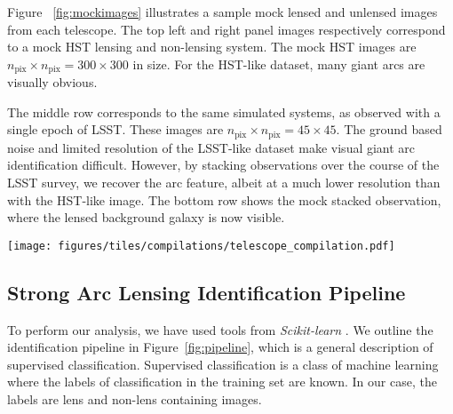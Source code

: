 \documentclass{emulateapj}
\begin{document}
Figure ~\ref{fig:mockimages} illustrates a sample mock lensed and
unlensed images from each telescope.  The top left and right panel
images respectively correspond to a mock HST lensing and non-lensing
system. The mock HST images are $n_\text{pix}\times
n_\text{pix}=300\times300$ in size.  For the HST-like dataset, many
giant arcs are visually obvious.

The middle row corresponds to the same simulated systems, as observed
with a single epoch of LSST.  These images are $n_\text{pix}\times
n_\text{pix}=45\times45$.  The ground based noise and limited
resolution of the LSST-like dataset make visual giant arc
identification difficult.  However, by stacking observations over the
course of the LSST survey, we recover the arc feature, albeit at a
much lower resolution than with the HST-like image. The bottom row
shows the mock stacked observation, where the lensed background galaxy
is now visible.

\begin{figure*}[t]\label{fig:mockimages}
\begin{center}
\texttt{[image: figures/tiles/compilations/telescope\_compilation.pdf]}
\caption{Left to right show example mock HST, LSST 10 year, and LSST 1
  year images.  The top row corresponds to a lensing system with a
  very visible arc signature, and the bottom row to a lensing system
  that is less obvious.  Example mock HST images have
  $n_\text{pix}\times n_\text{pix}=300\times300$.  Example mock LSST
  images have $n_\text{pix}\times n_\text{pix}=45\times45$.  The
  resolution and noise of a ground based telescope is noticeably
  worse. Visual identification of giant arcs in the LSST images in the
  bottom row is very difficult.}
\end{center}
\end{figure*}

\subsection{Strong Arc Lensing Identification Pipeline}

To perform our analysis, we have used tools from {\em Scikit-learn}
\citep{pedregosa_etal12}.  We outline the identification pipeline in
Figure~\ref{fig:pipeline}, which is a general description of
supervised classification.  Supervised classification is a class of
machine learning where the labels of classification in the training
set are known.  In our case, the labels are lens and non-lens
containing images.
\end{document}
